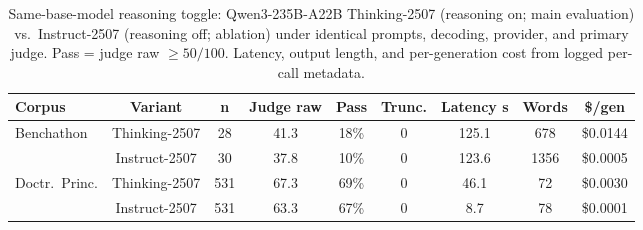 \begin{table}[t]
\centering\footnotesize
\caption{Same-base-model reasoning toggle: Qwen3-235B-A22B Thinking-2507 (reasoning on; main evaluation) vs.\ Instruct-2507 (reasoning off; ablation) under identical prompts, decoding, provider, and primary judge. Pass = judge raw $\geq 50/100$. Latency, output length, and per-generation cost from logged per-call metadata.}
\label{tbl-reasoning-ablation}
\setlength{\tabcolsep}{4pt}
\begin{tabular*}{\textwidth}{@{\extracolsep{\fill}}lcccccccc@{}}
\toprule
Corpus & Variant & n & Judge raw & Pass & Trunc. & Latency s & Words & \$/gen \\
\midrule
Benchathon & Thinking-2507 & 28 & 41.3 & 18\% & 0 & 125.1 & 678 & \$0.0144 \\
 & Instruct-2507 & 30 & 37.8 & 10\% & 0 & 123.6 & 1356 & \$0.0005 \\
Doctr.\ Princ. & Thinking-2507 & 531 & 67.3 & 69\% & 0 & 46.1 & 72 & \$0.0030 \\
 & Instruct-2507 & 531 & 63.3 & 67\% & 0 & 8.7 & 78 & \$0.0001 \\
\bottomrule
\end{tabular*}
\end{table}
